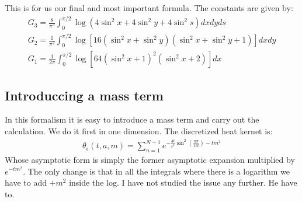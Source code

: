 \documentclass[12pt]{article}
\def\ep{\epsilon}
\begin{document}
This is for us our final and most important formula. The constants are given by:
\begin{gather}
G_3=\frac{8}{\pi^3}\int_0^{\pi/2}\log(4\sin^2 x+4\sin^2 y+4\sin^2 s)dxdyds\\
G_2=\frac{1}{\pi^2}\int_0^{\pi/2}\log\left[16(\sin^2 x+\sin^2 y)(\sin^2 x+\sin^2 y+1)\right]dxdy\\
G_1=\frac{1}{2\pi}\int_0^{\pi/2}\log\left[64(\sin^2x+1)^2(\sin^2x+2)\right]dx
\end{gather}
\subsection{Introduccing a mass term}
In this formalism it is easy to introduce a mass term and carry out the calculation. We do it first in one dimension. The discretized heat kernet is:
\begin{gather}
\theta_\ep(t,a,m)=\sum_{n=1}^{N-1} e^{-\frac{4t}{\ep^2}\sin^2\left(\frac{n\pi}{2N}\right)-tm^2}
\end{gather}
Whose asymptotic form is simply the former asymptotic expansion multiplied by $e^{-tm^2}$. The only change is that in all the integrals where there is a logarithm we have to add $+m^2$ inside the log. I have not studied the issue any further. He have to.
\end{document}

